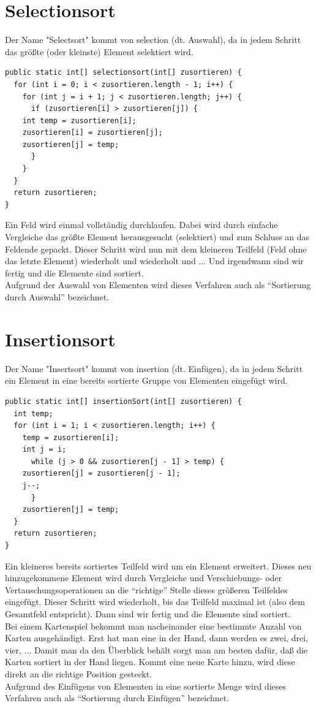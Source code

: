 \documentclass[a4paper,10pt,DIV9, BCOR12mm, oneside,openright,openbib]{scrreprt}
\theoremstyle{definition}
\theoremstyle{plain}
\begin{document}
\section{Selectionsort}
Der Name "Selectsort" kommt von selection (dt. Auswahl), da in jedem Schritt das größte (oder kleinste) Element selektiert wird.
\begin{lstlisting}[caption=Bubblesort]
public static int[] selectionsort(int[] zusortieren) {
  for (int i = 0; i < zusortieren.length - 1; i++) {
    for (int j = i + 1; j < zusortieren.length; j++) {
      if (zusortieren[i] > zusortieren[j]) {
	int temp = zusortieren[i];
	zusortieren[i] = zusortieren[j];
	zusortieren[j] = temp;
      }
    }
  }
  return zusortieren;
}
\end{lstlisting}
Ein Feld wird einmal vollständig durchlaufen. Dabei wird durch einfache Vergleiche das größte Element herausgesucht (selektiert) und zum Schluss an das Feldende gepackt. Dieser Schritt wird nun mit dem kleineren Teilfeld (Feld ohne das letzte Element) wiederholt und wiederholt und ... Und irgendwann sind wir fertig und die Elemente sind sortiert.\\
Aufgrund der Auswahl von Elementen wird dieses Verfahren auch als ``Sortierung durch Auswahl'' bezeichnet.

\section{Insertionsort}
Der Name "Insertsort" kommt von insertion (dt. Einfügen), da in jedem Schritt ein Element in eine bereits sortierte Gruppe von Elementen eingefügt wird.
\begin{lstlisting}[caption=Bubblesort]
public static int[] insertionSort(int[] zusortieren) {
  int temp;
  for (int i = 1; i < zusortieren.length; i++) {
    temp = zusortieren[i];
    int j = i;
      while (j > 0 && zusortieren[j - 1] > temp) {
	zusortieren[j] = zusortieren[j - 1];
	j--;
      }
    zusortieren[j] = temp;
  }
  return zusortieren;
}
\end{lstlisting}
Ein kleineres bereits sortiertes Teilfeld wird um ein Element erweitert. Dieses neu hinzugekommene Element wird durch Vergleiche und Verschiebungs- oder Vertauschungsoperationen an die ``richtige'' Stelle dieses größeren Teilfeldes eingefügt. Dieser Schritt wird wiederholt, bis das Teilfeld maximal ist (also dem Gesamtfeld entspricht). Dann sind wir fertig und die Elemente sind sortiert.\\
Bei einem Kartenspiel bekommt man nacheinander eine bestimmte Anzahl von Karten ausgehändigt. Erst hat man eine in der Hand, dann werden es zwei, drei, vier, ... Damit man da den Überblick behält sorgt man am besten dafür, daß die Karten sortiert in der Hand liegen. Kommt eine neue Karte hinzu, wird diese direkt an die richtige Position gesteckt.\\
Aufgrund des Einfügens von Elementen in eine sortierte Menge wird dieses Verfahren auch als ``Sortierung durch Einfügen'' bezeichnet.
\end{document}
